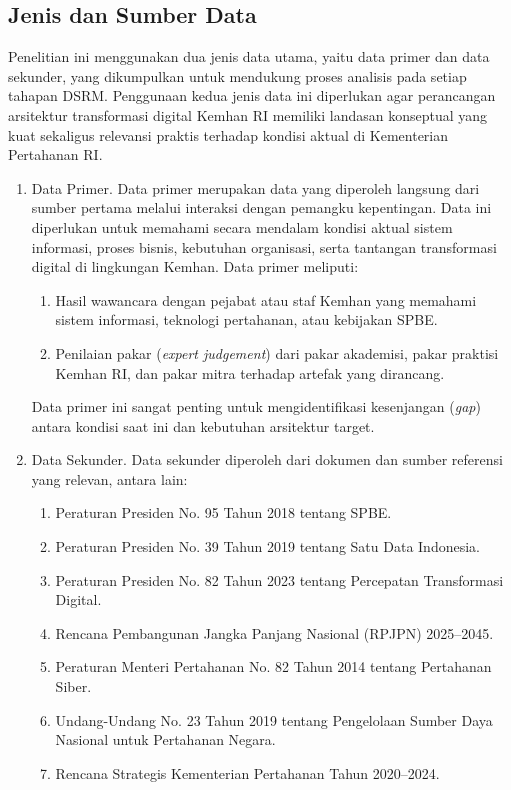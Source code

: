 \subsection{Jenis dan Sumber Data}
Penelitian ini menggunakan dua jenis data utama, yaitu data primer dan data sekunder, yang dikumpulkan untuk mendukung proses analisis pada setiap tahapan DSRM.
Penggunaan kedua jenis data ini diperlukan agar perancangan arsitektur transformasi digital Kemhan RI memiliki landasan konseptual yang kuat sekaligus relevansi praktis terhadap kondisi aktual di Kementerian Pertahanan RI.
\begin{enumerate}
  \item Data Primer.
  Data primer merupakan data yang diperoleh langsung dari sumber pertama melalui interaksi dengan pemangku kepentingan.
  Data ini diperlukan untuk memahami secara mendalam kondisi aktual sistem informasi, proses bisnis, kebutuhan organisasi, serta tantangan transformasi digital di lingkungan Kemhan. Data primer meliputi:
  \begin{enumerate}
    \item Hasil wawancara dengan pejabat atau staf Kemhan yang memahami sistem informasi, teknologi pertahanan, atau kebijakan SPBE.
    \item Penilaian pakar (\textit{expert judgement}) dari pakar akademisi, pakar praktisi Kemhan RI, dan pakar mitra terhadap artefak yang dirancang.
  \end{enumerate}
  Data primer ini sangat penting untuk mengidentifikasi kesenjangan (\textit{gap}) antara kondisi saat ini dan kebutuhan arsitektur target.
  \item Data Sekunder.
  Data sekunder diperoleh dari dokumen dan sumber referensi yang relevan, antara lain:
  \begin{enumerate}
    \item Peraturan Presiden No. 95 Tahun 2018 tentang SPBE.
    \item Peraturan Presiden No. 39 Tahun 2019 tentang Satu Data Indonesia.
    \item Peraturan Presiden No. 82 Tahun 2023 tentang Percepatan Transformasi Digital.
    \item Rencana Pembangunan Jangka Panjang Nasional (RPJPN) 2025--2045.
    \item Peraturan Menteri Pertahanan No. 82 Tahun 2014 tentang Pertahanan Siber.
    \item Undang-Undang No. 23 Tahun 2019 tentang Pengelolaan Sumber Daya Nasional untuk Pertahanan Negara.
    \item Rencana Strategis Kementerian Pertahanan Tahun 2020--2024.

\end{enumerate}
\end{enumerate}

